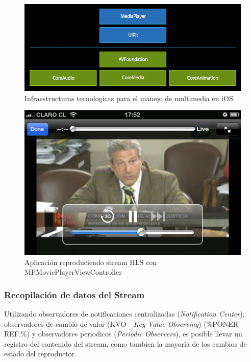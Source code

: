 \begin{figure}[h!]
	\centering
	\includegraphics[scale=0.5]{imgs/ios-tech-frameworks.png}
	\caption{Infraestructuras tecnologicas para el manejo de multimedia en iOS}
	\label{IMG-ios-tech-frameworks}	
\end{figure}

\begin{figure}[h!]
	\centering
	\includegraphics[scale=0.3]{imgs/mpmpvc-example.png}
	\caption{Aplicación reproduciendo stream HLS con MPMoviePlayerViewController}
	\label{IMG-mpmpvc-example}	
\end{figure}

		\subsubsection{Recopilación de datos del Stream}
Utilizando observadores de notificaciones centralizadas (\textit{Notification Center}), observadores de cambio de valor (KVO - \textit{Key Value Observing}) (\%PONER REF.\%) y observadores periodicos (\textit{Periodic Observers}), es posible llevar un registro del contenido del stream, como tambien la mayoría de los cambios de estado del reproductor.

